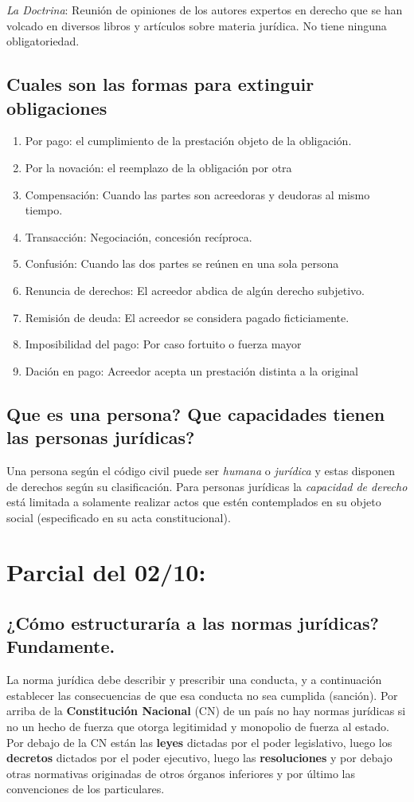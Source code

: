 \documentclass{article}
\begin{document}
\textit{La Doctrina}: Reunión de opiniones  de los autores expertos en derecho que se han volcado en diversos libros y artículos sobre materia jurídica. No tiene ninguna obligatoriedad.

\subsection{Cuales son las formas para extinguir obligaciones}
\begin{enumerate}
\item Por pago: el cumplimiento de la prestación objeto de la obligación.
\item Por la novación: el reemplazo de la obligación por otra
\item Compensación: Cuando las partes son acreedoras y deudoras al mismo tiempo.
\item Transacción: Negociación, concesión recíproca. 
\item Confusión: Cuando las dos partes se reúnen en una sola persona
\item Renuncia de derechos: El acreedor abdica de algún derecho subjetivo.
\item Remisión de deuda: El acreedor se considera pagado ficticiamente. 
\item Imposibilidad del pago: Por caso fortuito o fuerza mayor
\item Dación en pago: Acreedor acepta un prestación distinta a la original
\end{enumerate}


\subsection{Que es una persona? Que capacidades tienen las personas jurídicas?}

Una persona según el código civil puede ser \textit{humana} o \textit{jurídica} y estas disponen de derechos según su clasificación. Para personas jurídicas la \textit{capacidad de derecho} está limitada a solamente realizar actos que estén contemplados en su objeto social (especificado en su acta constitucional). 

\section{Parcial del 02/10:}
\subsection{¿Cómo estructuraría a las normas jurídicas? Fundamente.}
La norma jurídica debe describir y prescribir una conducta, y a continuación establecer las consecuencias de que esa conducta no sea cumplida (sanción).
	Por arriba de la \textbf{Constitución Nacional} (CN) de un país no hay normas jurídicas si no un hecho de fuerza que otorga legitimidad y monopolio de fuerza al estado. Por debajo de la CN están las \textbf{leyes} dictadas por el poder legislativo, luego los \textbf{decretos} dictados por el poder ejecutivo, luego las \textbf{resoluciones} y por debajo otras normativas originadas de otros órganos inferiores y por último las convenciones de los particulares.
\end{document}
